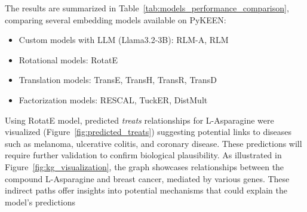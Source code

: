 The results are summarized in Table~\ref{tab:models_performance_comparison}, comparing several embedding models available on PyKEEN:
\begin{itemize}
    \item Custom models with LLM (Llama3.2-3B): RLM-A, RLM
    \item Rotational models: RotatE
    \item Translation models: TransE, TransH, TransR, TransD
    \item Factorization models: RESCAL, TuckER, DistMult
\end{itemize}




Using RotatE model, predicted \textit{treats} relationships for L-Asparagine were visualized (Figure~\ref{fig:predicted_treats}) suggesting potential links to diseases such as melanoma, ulcerative colitis, and coronary disease. These predictions will require further validation to confirm biological plausibility. As illustrated in Figure~\ref{fig:kg_visualization}, the graph showcases relationships between the compound L-Asparagine and breast cancer, mediated by various genes. These indirect paths offer insights into potential mechanisms that could explain the model's predictions

